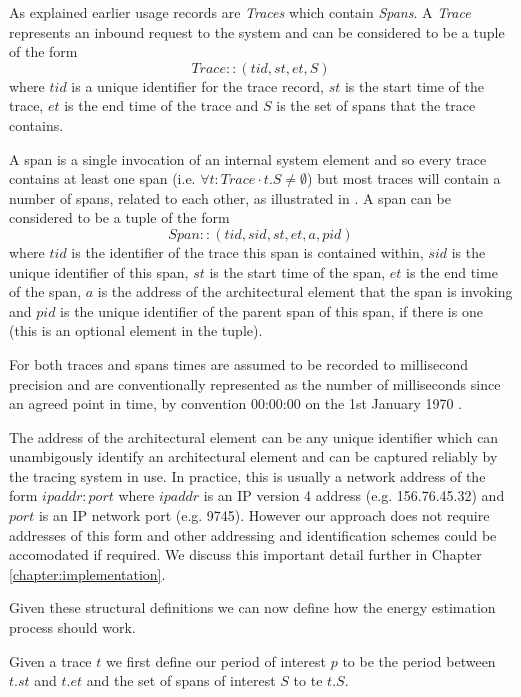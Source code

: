 As explained earlier usage records are \emph{Traces} which contain \emph{Spans}.  A \emph{Trace} represents an inbound request to the system and can be considered to be a tuple of the form 
\begin{equation}
Trace :: (tid, st, et, S)
\end{equation}
where $tid$ is a unique identifier for the trace record, $st$ is the start time of the trace, $et$ is the end time of the trace and $S$ is the set of spans that the trace contains.  

A span is a single invocation of an internal system element and so every trace contains at least one span (i.e. $\forall t : Trace \cdot t.S \neq \emptyset$) but most traces will contain a number of spans, related to each other, as illustrated in .  A span can be considered to be a tuple of the form
\begin{equation}
Span :: (tid, sid, st, et, a, pid)
\end{equation}
where $tid$ is the identifier of the trace this span is contained within, $sid$ is the unique identifier of this span, $st$ is the start time of the span, $et$ is the end time of the span, $a$ is the address of the architectural element that the span is invoking and $pid$ is the unique identifier of the parent span of this span, if there is one (this is an optional element in the tuple).

For both traces and spans times are assumed to be recorded to millisecond precision and are conventionally represented as the number of milliseconds since an agreed point in time, by convention 00:00:00 on the 1st January 1970 \cite{josey2004-ieee1003}.

The address of the architectural element can be any unique identifier which can unambigously identify an architectural element and can be captured reliably by the tracing system in use.  In practice, this is usually a network address of the form $ipaddr:port$ where $ipaddr$ is an IP version 4 address (e.g. 156.76.45.32) and $port$ is an IP network port (e.g. 9745).  However our approach does not require addresses of this form and other addressing and identification schemes could be accomodated if required.  We discuss this important detail further in Chapter \ref{chapter:implementation}.

Given these structural definitions we can now define how the energy estimation process should work.

Given a trace $t$ we first define our period of interest $p$ to be the period between $t.st$ and $t.et$ and the set of spans of interest $S$ to te $t.S$.

